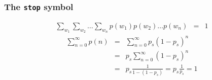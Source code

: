 \begin{frame}
\frametitle{The {\tt stop} symbol}
\begin{eqnarray*}
\sum_{w_1} \sum_{w_2} \ldots \sum_{w_n} p(w_1) p(w_2) \ldots p(w_n) &=& 1
\end{eqnarray*}
\begin{eqnarray*}
\sum_{n=0}^\infty p(n) &=& \sum_{n=0}^\infty p_s(1 - p_s)^n \\
&=& p_s \sum_{n=0}^\infty (1 - p_s)^n \\
&=& p_s \frac{1}{1-(1-p_s)} = p_s \frac{1}{p_s} = 1
\end{eqnarray*}
\end{frame}




 
